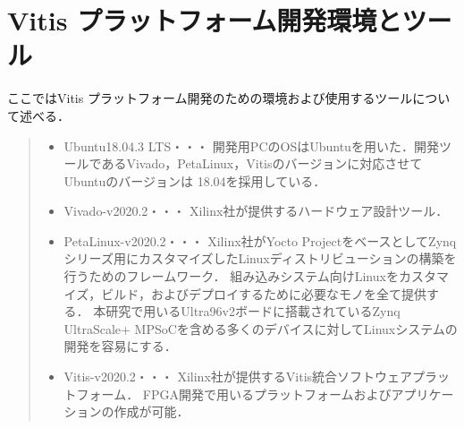 \documentclass[11pt,a4j]{jreport}
\begin{document}
\section{Vitis プラットフォーム開発環境とツール}
ここではVitis プラットフォーム開発のための環境および使用するツールについて述べる．
\begin{quote}
  \begin{itemize}
    \item Ubuntu18.04.3 LTS・・・
    開発用PCのOSはUbuntuを用いた．開発ツールであるVivado，PetaLinux，Vitisのバージョンに対応させてUbuntuのバージョンは
    18.04を採用している．
    \item Vivado-v2020.2・・・
    Xilinx社が提供するハードウェア設計ツール．
    \item PetaLinux-v2020.2・・・
    Xilinx社がYocto ProjectをベースとしてZynqシリーズ用にカスタマイズしたLinuxディストリビューションの構築を行うためのフレームワーク．
    組み込みシステム向けLinuxをカスタマイズ，ビルド，およびデプロイするために必要なモノを全て提供する．
    本研究で用いるUltra96v2ボードに搭載されているZynq UltraScale+ MPSoCを含める多くのデバイスに対してLinuxシステムの開発を容易にする．
    \item Vitis-v2020.2・・・
    Xilinx社が提供するVitis統合ソフトウェアプラットフォーム．
    FPGA開発で用いるプラットフォームおよびアプリケーションの作成が可能．
  \end{itemize}
\end{quote}
\end{document}
